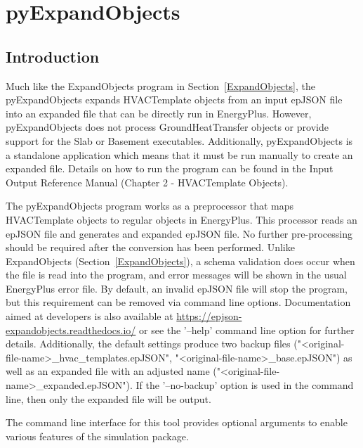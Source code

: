 \section{pyExpandObjects}

\subsection{Introduction}\label{pyExpandObjects}

Much like the ExpandObjects program in Section~\ref{ExpandObjects}, the pyExpandObjects expands HVACTemplate objects from an input epJSON file into an expanded file that can be directly run in EnergyPlus.  However, pyExpandObjects does not process GroundHeatTransfer objects or provide support for the Slab or Basement executables.  Additionally, pyExpandObjects is a standalone application which means that it must be run manually to create an expanded file.  Details on how to run the program can be found in the Input Output Reference Manual (Chapter 2 - HVACTemplate Objects).

The pyExpandObjects program works as a preprocessor that maps HVACTemplate objects to regular objects in EnergyPlus.  This processor reads an epJSON file and generates and expanded epJSON file.  No further pre-processing should be required after the conversion has been performed.  Unlike ExpandObjects (Section~\ref{ExpandObjects}), a schema validation does occur when the file is read into the program, and error messages will be shown in the usual EnergyPlus error file.  By default, an invalid epJSON file will stop the program, but this requirement can be removed via command line options.  Documentation aimed at developers is also available at \url{https://epjson-expandobjects.readthedocs.io/} or see the '--help' command line option for further details.  Additionally, the default settings produce two backup files ("<original-file-name>\_hvac\_templates.epJSON", "<original-file-name>\_base.epJSON") as well as an expanded file with an adjusted name ("<original-file-name>\_expanded.epJSON"). If the '--no-backup' option is used in the command line, then only the expanded file will be output.

The command line interface for this tool provides optional arguments to enable various features of the simulation package.


